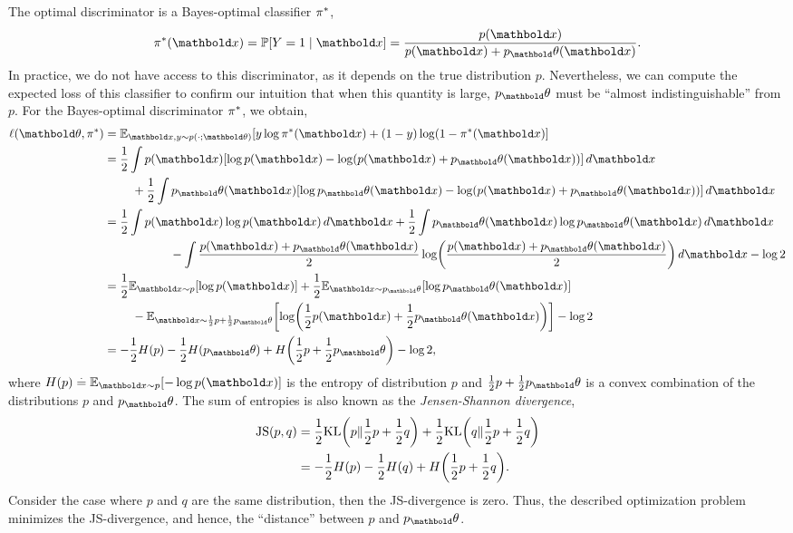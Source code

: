 \documentclass{tufte-handout}
\begin{document}
The optimal discriminator is a Bayes-optimal classifier $\pi^*$, \begin{align}
    \s{\pi}(\vx) = \Pr{Y = 1 \mid \vx} = \frac{p(\vx)}{p(\vx) + p_\vtheta(\vx)}.
\end{align} In practice, we do not have access to this discriminator, as it depends on the true distribution $p$. Nevertheless, we can compute the expected loss of this classifier to confirm our intuition that when this quantity is large, $p_\vtheta$ must be ``almost indistinguishable'' from $p$.  For the Bayes-optimal discriminator $\pi^*$, we obtain, \begin{align}
    \ell(\vtheta, \s{\pi}) &= \E[\vx, y \sim p(\cdot; \vtheta)]{y \log \s{\pi}(\vx) + (1-y) \log (1 - \s{\pi}(\vx)} \nonumber\\
    &= \begin{multlined}[t]
        \frac{1}{2} \int p(\vx) [\log p(\vx) - \log(p(\vx) + p_\vtheta(\vx))] \,d\vx \\ + \frac{1}{2} \int p_\vtheta(\vx) [\log p_\vtheta(\vx) - \log(p(\vx) + p_\vtheta(\vx))] \,d\vx
    \end{multlined} \nonumber\\
    &= \begin{multlined}[t]
        \frac{1}{2} \int p(\vx) \log p(\vx) \,d\vx + \frac{1}{2} \int p_\vtheta(\vx) \log p_\vtheta(\vx) \,d\vx \\ - \int \frac{p(\vx) + p_\vtheta(\vx)}{2} \log\parentheses*{\frac{p(\vx) + p_\vtheta(\vx)}{2}} \,d\vx - \log 2
    \end{multlined} \nonumber\\
    &= \begin{multlined}[t]
        \frac{1}{2} \E[\vx \sim p]{\log p(\vx)} + \frac{1}{2} \E[\vx \sim p_\vtheta]{\log p_\vtheta(\vx)} \\ - \E[\vx \sim \frac{1}{2}p + \frac{1}{2}p_\vtheta]{\log\parentheses*{\frac{1}{2}p(\vx) + \frac{1}{2}p_\vtheta(\vx)}} - \log 2
    \end{multlined} \nonumber\\
    &= - \frac{1}{2} H(p) - \frac{1}{2} H(p_\vtheta) + H\parentheses*{\frac{1}{2}p + \frac{1}{2}p_\vtheta} - \log 2,
\end{align} where $H(p) \defeq \E[\vx \sim p]{- \log p(\vx)}$ is the entropy of distribution $p$ and $\frac{1}{2}p + \frac{1}{2}p_\vtheta$ is a convex combination of the distributions $p$ and $p_\vtheta$. The sum of entropies is also known as the \emph{Jensen-Shannon divergence}, \begin{align}
    \JS{p, q} &= \frac{1}{2} \KL{p}{\frac{1}{2}p + \frac{1}{2}q} + \frac{1}{2} \KL{q}{\frac{1}{2}p + \frac{1}{2}q} \\
    &= - \frac{1}{2} H(p) - \frac{1}{2} H(q) + H\parentheses*{\frac{1}{2}p + \frac{1}{2}q}.
\end{align} Consider the case where $p$ and $q$ are the same distribution, then the JS-divergence is zero. Thus, the described optimization problem minimizes the JS-divergence, and hence, the ``distance'' between $p$ and $p_\vtheta$.
\end{document}
